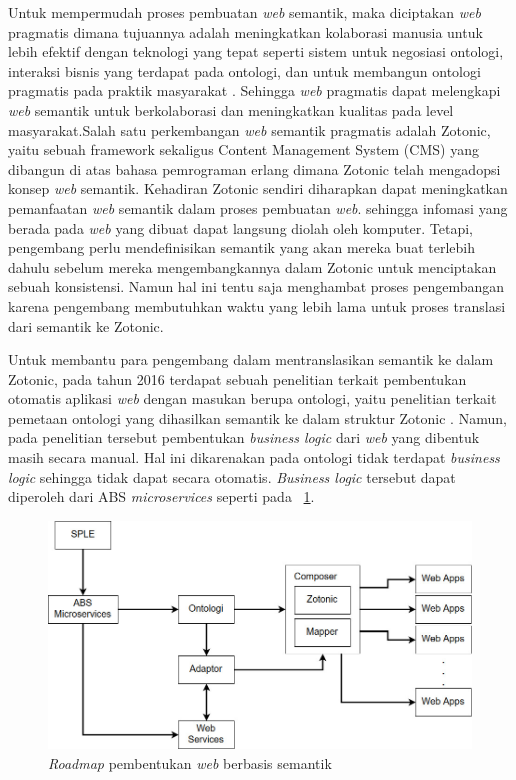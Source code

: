 Untuk mempermudah proses pembuatan \textit{web} semantik, maka diciptakan \textit{web} pragmatis dimana tujuannya adalah meningkatkan kolaborasi manusia untuk lebih efektif dengan teknologi yang tepat seperti sistem untuk negosiasi ontologi, interaksi bisnis yang terdapat pada ontologi, dan untuk membangun ontologi pragmatis pada praktik masyarakat \citep{pragmatic.web}. Sehingga \textit{web} pragmatis dapat melengkapi \textit{web} semantik untuk berkolaborasi dan meningkatkan kualitas pada level masyarakat.Salah satu perkembangan \textit{web} semantik pragmatis adalah Zotonic, yaitu sebuah framework sekaligus Content Management System (CMS) yang dibangun di atas bahasa pemrograman erlang dimana Zotonic telah mengadopsi konsep \textit{web} semantik. Kehadiran Zotonic sendiri diharapkan dapat meningkatkan pemanfaatan \textit{web} semantik dalam proses pembuatan \textit{web}. sehingga infomasi yang berada pada \textit{web} yang dibuat dapat langsung diolah oleh komputer. Tetapi, pengembang perlu mendefinisikan semantik yang akan mereka buat terlebih dahulu sebelum mereka mengembangkannya dalam Zotonic untuk menciptakan sebuah konsistensi. Namun hal ini tentu saja menghambat proses pengembangan karena pengembang membutuhkan waktu yang lebih lama untuk proses translasi dari semantik ke Zotonic.

Untuk membantu para pengembang dalam mentranslasikan semantik ke dalam Zotonic, pada tahun 2016 terdapat sebuah penelitian terkait pembentukan otomatis aplikasi \textit{web} dengan masukan berupa ontologi, yaitu penelitian terkait pemetaan ontologi yang dihasilkan semantik ke dalam struktur Zotonic \citep{bravyto}. Namun, pada penelitian tersebut pembentukan \textit{business logic} dari \textit{web} yang dibentuk masih secara manual. Hal ini dikarenakan pada ontologi tidak terdapat \textit{business logic} sehingga tidak dapat secara otomatis. \textit{Business logic} tersebut dapat diperoleh dari ABS \textit{microservices} seperti pada \pic~\ref{fig:roadmapbab1}.

\begin{figure}
	\centering
	\includegraphics[width=1\textwidth]
	{pics/roadmapbab1.jpg}
	\caption{\textit{Roadmap} pembentukan \textit{web} berbasis semantik}
	\label{fig:roadmapbab1}
\end{figure}
\vspace{-0.3cm}

